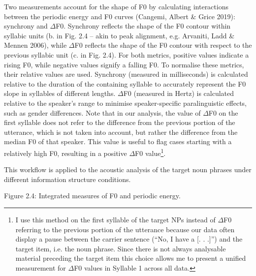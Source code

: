 \begin{styleStandard}
Two measurements account for the shape of F0 by calculating interactions between the periodic energy and F0 curves (Cangemi, Albert \& Grice 2019): synchrony and ${\Delta}$F0. Synchrony reflects the shape of the F0 contour within syllabic units (b. in Fig. 2.4 – akin to peak alignment, e.g. Arvaniti, Ladd \& Mennen 2006), while ${\Delta}$F0 reflects the shape of the F0 contour with respect to the previous syllabic unit (c. in Fig. 2.4). For both metrics, positive values indicate a rising F0, while negative values signify a falling F0. To normalise these metrics, their relative values are used. Synchrony (measured in milliseconds) is calculated relative to the duration of the containing syllable to accurately represent the F0 slope in syllables of different lengths. $\Delta $F0 (measured in Hertz) is calculated relative to the speaker's range to minimise speaker-specific paralinguistic effects, such as gender differences. Note that in our analysis, the value of ${\Delta}$F0 on the first syllable does not refer to the difference from the previous portion of the utterance, which is not taken into account, but rather the difference from the median F0 of that speaker. This value is useful to flag cases starting with a relatively high F0, resulting in a positive ${\Delta}$F0 value\footnote{I use this method on the first syllable of the target NPs instead of ${\Delta}$F0 referring to the previous portion of the utterance because our data often display a pause between the carrier sentence (“No, I have a [. . .]”) and the target item, i.e. the noun phrase. Since there is not always analysable material preceding the target item this choice allows me to present a unified measurement for ${\Delta}$F0 values in Syllable 1 across all data.}. 
\end{styleStandard}

\begin{styleStandard}
This workflow is applied to the acoustic analysis of the target noun phrases under different information structure conditions. 
\end{styleStandard}

\begin{styleTextbody}
  [Warning: Image ignored] %
 
\end{styleTextbody}

\begin{stylecaption}
Figure 2.4: Integrated measures of F0 and periodic energy. 
\end{stylecaption}

